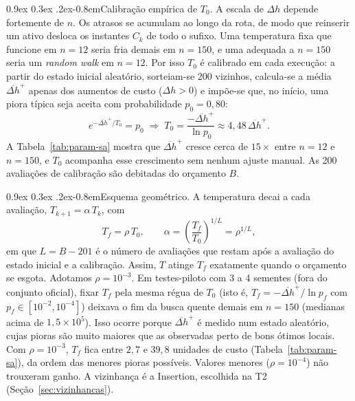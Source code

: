 \documentclass[10pt,a4paper,twocolumn]{article}
\makeatletter
\renewcommand\paragraph{\@startsection{paragraph}{4}{\z@}%
  {0.9ex \@plus 0.3ex \@minus .2ex}{-0.8em}{\normalfont\normalsize\bfseries}}
\makeatother
\begin{document}
\paragraph{Calibração empírica de $T_0$.}
A escala de $\Delta h$ depende fortemente de $n$. Os atrasos se acumulam ao longo
da rota, de modo que reinserir um ativo desloca os instantes $C_k$ de todo o sufixo.
Uma temperatura fixa que funcione em $n=12$ seria fria demais em $n=150$, e uma
adequada a $n=150$ seria um \textit{random walk} em $n=12$. Por isso $T_0$ é
calibrado em cada execução: a partir do estado inicial aleatório, sorteiam-se
200 vizinhos, calcula-se a média $\overline{\Delta h}^{+}$ apenas dos aumentos de
custo ($\Delta h>0$) e impõe-se que, no início, uma piora típica seja aceita com
probabilidade $p_0=0{,}80$:
\begin{equation}
  e^{-\overline{\Delta h}^{+}/T_0} = p_0
  \;\Longrightarrow\;
  T_0 = \frac{-\overline{\Delta h}^{+}}{\ln p_0} \approx 4{,}48\,\overline{\Delta h}^{+}.
  \label{eq:t0}
\end{equation}
A Tabela~\ref{tab:param-sa} mostra que $\overline{\Delta h}^{+}$ cresce cerca de
$15\times$ entre $n=12$ e $n=150$, e $T_0$ acompanha esse crescimento sem nenhum
ajuste manual. As 200 avaliações de calibração são debitadas do orçamento $B$.

\paragraph{Esquema geométrico.}
A temperatura decai a cada avaliação, $T_{k+1}=\alpha\,T_k$, com
\begin{equation}
  T_f = \rho\,T_0,\qquad \alpha = \left(\frac{T_f}{T_0}\right)^{1/L} = \rho^{1/L},
  \label{eq:alpha}
\end{equation}
em que $L = B - 201$ é o número de avaliações que restam após a avaliação do estado
inicial e a calibração. Assim, $T$ atinge $T_f$ exatamente quando o orçamento se esgota.
Adotamos $\rho = 10^{-3}$. Em testes-piloto com 3 a 4 sementes (fora do conjunto
oficial), fixar $T_f$ pela mesma régua de $T_0$ (isto é, $T_f=-\overline{\Delta h}^{+}/\ln p_f$
com $p_f\in[10^{-2},10^{-4}]$) deixava o fim da busca quente demais em $n=150$
(medianas acima de $1{,}5\times10^{5}$). Isso ocorre porque
$\overline{\Delta h}^{+}$ é medido num estado aleatório, cujas pioras são muito maiores
que as observadas perto de bons ótimos locais. Com $\rho=10^{-3}$, $T_f$ fica entre
$2{,}7$ e $39{,}8$ unidades de custo (Tabela~\ref{tab:param-sa}), da ordem das
menores pioras possíveis. Valores menores ($\rho=10^{-4}$) não
trouxeram ganho. A vizinhança é a Insertion, escolhida na T2
(Seção~\ref{sec:vizinhancas}).
\end{document}
